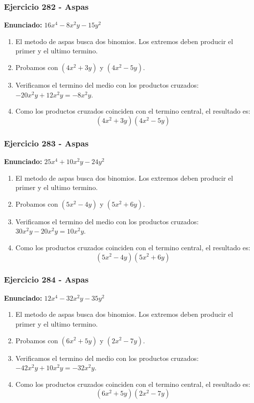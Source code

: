 \documentclass[11pt,a4paper]{article}
\begin{document}
\vspace{0.2cm}
\subsubsection*{Ejercicio 282 - Aspas}
\textbf{Enunciado:} $ 16 x^{4} - 8 x^{2} y - 15 y^{2} $\par
\begin{enumerate}[leftmargin=2em]
\item El metodo de aspas busca dos binomios. Los extremos deben producir el primer y el ultimo termino.
\item Probamos con \((4 x^{2} + 3 y)\) y \((4 x^{2} - 5 y)\).
\item Verificamos el termino del medio con los productos cruzados: \(- 20 x^{2} y+12 x^{2} y=- 8 x^{2} y\).
\item Como los productos cruzados coinciden con el termino central, el resultado es: \[\boxed{\left(4 x^{2} + 3 y\right)\left(4 x^{2} - 5 y\right)}\]
\end{enumerate}

\vspace{0.2cm}
\subsubsection*{Ejercicio 283 - Aspas}
\textbf{Enunciado:} $ 25 x^{4} + 10 x^{2} y - 24 y^{2} $\par
\begin{enumerate}[leftmargin=2em]
\item El metodo de aspas busca dos binomios. Los extremos deben producir el primer y el ultimo termino.
\item Probamos con \((5 x^{2} - 4 y)\) y \((5 x^{2} + 6 y)\).
\item Verificamos el termino del medio con los productos cruzados: \(30 x^{2} y- 20 x^{2} y=10 x^{2} y\).
\item Como los productos cruzados coinciden con el termino central, el resultado es: \[\boxed{\left(5 x^{2} - 4 y\right)\left(5 x^{2} + 6 y\right)}\]
\end{enumerate}

\vspace{0.2cm}
\subsubsection*{Ejercicio 284 - Aspas}
\textbf{Enunciado:} $ 12 x^{4} - 32 x^{2} y - 35 y^{2} $\par
\begin{enumerate}[leftmargin=2em]
\item El metodo de aspas busca dos binomios. Los extremos deben producir el primer y el ultimo termino.
\item Probamos con \((6 x^{2} + 5 y)\) y \((2 x^{2} - 7 y)\).
\item Verificamos el termino del medio con los productos cruzados: \(- 42 x^{2} y+10 x^{2} y=- 32 x^{2} y\).
\item Como los productos cruzados coinciden con el termino central, el resultado es: \[\boxed{\left(6 x^{2} + 5 y\right)\left(2 x^{2} - 7 y\right)}\]
\end{enumerate}
\end{document}
